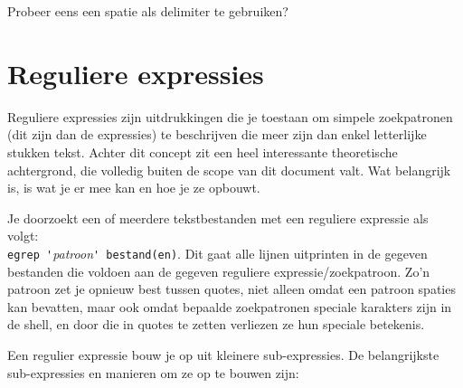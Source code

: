 \documentclass[a4paper,twoside,openany]{memoir}
\begin{document}
Probeer eens een spatie als delimiter te gebruiken?

\chapter{Reguliere expressies}
\label{regexp_basic}

Reguliere expressies zijn uitdrukkingen die je toestaan om simpele zoekpatronen
(dit zijn dan de expressies) te beschrijven die meer zijn dan enkel letterlijke
stukken tekst. Achter dit concept zit een heel interessante theoretische
achtergrond, die volledig buiten de scope van dit document valt. Wat belangrijk
is, is wat je er mee kan en hoe je ze opbouwt.

Je doorzoekt een of meerdere tekstbestanden met een reguliere expressie als
volgt:\\
\verb!egrep '!\emph{patroon}\verb!' bestand(en)!. Dit gaat alle lijnen
uitprinten in de gegeven bestanden die voldoen aan de gegeven reguliere
expressie/zoekpatroon. Zo'n patroon zet je opnieuw best tussen quotes, niet
alleen omdat een patroon spaties kan bevatten, maar ook omdat bepaalde
zoekpatronen speciale karakters zijn in de shell, en door die in quotes te
zetten verliezen ze hun speciale betekenis.

Een regulier expressie bouw je op uit kleinere sub-expressies. De belangrijkste sub-expressies en manieren om ze op te bouwen zijn:
\end{document}
